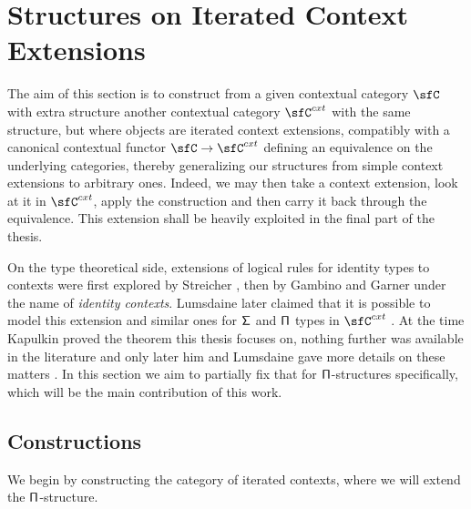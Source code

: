 \chapter{Structures on Iterated Context Extensions}

The aim of this section is to construct from a given contextual category $\sfC$
with extra structure another contextual category $\sfC^{cxt}$ with the same
structure, but where objects are iterated context extensions, compatibly with a
canonical contextual functor $\sfC\rightarrow\sfC^{cxt}$ defining an equivalence
on the underlying categories, thereby
generalizing our structures from simple context extensions to arbitrary ones.
Indeed, we may then take a context extension, look at it in $\sfC^{cxt}$, apply
the construction and then carry it back through the equivalence. This extension
shall be heavily exploited in the final part of the thesis.

On the type theoretical side, extensions of logical rules for identity types to
contexts were first explored by Streicher \cite{Str93}, then by Gambino and
Garner \cite{GG08} under the name of \emph{identity contexts}. Lumsdaine later
claimed that it is possible to model this extension and similar ones for
$\operatorname{\mathsf{\Sigma}}$ and $\operatorname{\mathsf{\Pi}}$ types in $\sfC^{cxt}$ \cite[26]{Lum10}. At the time
Kapulkin proved the theorem this thesis focuses on,
nothing further was available in the literature and only later him and
Lumsdaine gave more details on these matters \cite{KL18}. In this section we aim
to partially fix that for $\operatorname{\mathsf{\Pi}}$-structures specifically, which will be the main
contribution of this work.

\section{Constructions}

We begin by constructing the category of iterated contexts, where we
will extend the $\operatorname{\mathsf{\Pi}}$-structure.

